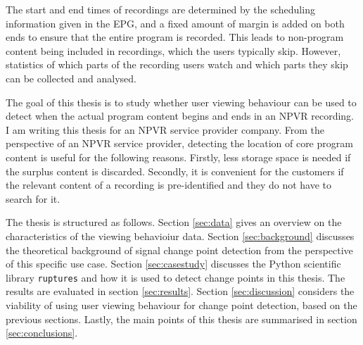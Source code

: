 The start and end times of recordings are determined by the scheduling information given in the EPG, and a fixed amount of margin is added on both ends to ensure that the entire program is recorded. %
This leads to non-program content being included in recordings, which the users typically skip. %
However, statistics of which parts of the recording users watch and which parts they skip can be collected and analysed. 

The goal of this thesis is to study whether user viewing behaviour can be used to %
detect when the actual program content begins and ends in an NPVR recording. I am writing this thesis for an NPVR service provider company. From the perspective of an NPVR service provider, detecting the location of core program content is useful for the following reasons. Firstly, less storage space is needed if the surplus content is discarded. Secondly, it is convenient for the customers if the relevant content of a recording is pre-identified and they do not have to search for it. %


The thesis is structured as follows. Section \ref{sec:data} gives an overview on the characteristics of the viewing behavioiur data. Section \ref{sec:background} discusses the theoretical background of signal change point detection from the perspective of this specific use case. %
Section \ref{sec:casestudy} discusses the Python scientific library \texttt{ruptures} and how it is used to detect change points in this thesis. The results are evaluated in section \ref{sec:results}. Section \ref{sec:discussion} considers the viability of using user viewing behaviour for change point detection, based on the previous sections. Lastly, the main points of this thesis are summarised in section \ref{sec:conclusions}.

